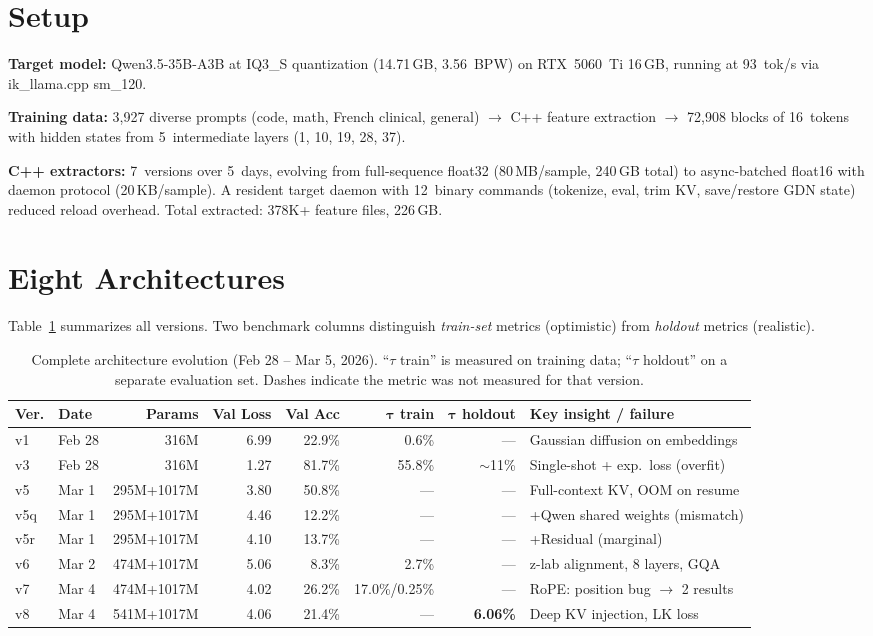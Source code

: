 \documentclass[10pt,a4paper]{article}
\begin{document}
\section{Setup}

\textbf{Target model:} Qwen3.5-35B-A3B at IQ3\_S quantization (14.71\,GB, 3.56~BPW) on RTX~5060~Ti 16\,GB, running at 93~tok/s via ik\_llama.cpp sm\_120.

\textbf{Training data:} 3{,}927 diverse prompts (code, math, French clinical, general) $\to$ C++ feature extraction $\to$ 72{,}908 blocks of 16~tokens with hidden states from 5~intermediate layers (1, 10, 19, 28, 37).

\textbf{C++ extractors:} 7~versions over 5~days, evolving from full-sequence float32 (80\,MB/sample, 240\,GB total) to async-batched float16 with daemon protocol (20\,KB/sample). A resident target daemon with 12~binary commands (tokenize, eval, trim KV, save/restore GDN state) reduced reload overhead. Total extracted: 378K+ feature files, 226\,GB.

\section{Eight Architectures}
\label{sec:arch}

Table~\ref{tab:full} summarizes all versions. Two benchmark columns distinguish \emph{train-set} metrics (optimistic) from \emph{holdout} metrics (realistic).

\begin{table}[h]
\centering
\caption{Complete architecture evolution (Feb 28 -- Mar 5, 2026). ``$\tau$ train'' is measured on training data; ``$\tau$ holdout'' on a separate evaluation set. Dashes indicate the metric was not measured for that version.}
\small
\begin{tabular}{llrrrrrl}
\toprule
\textbf{Ver.} & \textbf{Date} & \textbf{Params} & \textbf{Val Loss} & \textbf{Val Acc} & $\boldsymbol{\tau}$ \textbf{train} & $\boldsymbol{\tau}$ \textbf{holdout} & \textbf{Key insight / failure} \\
\midrule
v1  & Feb 28 & 316M & 6.99 & 22.9\% & 0.6\% & --- & Gaussian diffusion on embeddings \\
v3  & Feb 28 & 316M & 1.27 & 81.7\% & 55.8\% & $\sim$11\% & Single-shot + exp.\ loss (overfit) \\
v5  & Mar 1  & 295M+1017M & 3.80 & 50.8\% & --- & --- & Full-context KV, OOM on resume \\
v5q & Mar 1  & 295M+1017M & 4.46 & 12.2\% & --- & --- & +Qwen shared weights (mismatch) \\
v5r & Mar 1  & 295M+1017M & 4.10 & 13.7\% & --- & --- & +Residual (marginal) \\
v6  & Mar 2  & 474M+1017M & 5.06 & 8.3\% & 2.7\% & --- & z-lab alignment, 8 layers, GQA \\
v7  & Mar 4  & 474M+1017M & 4.02 & 26.2\% & 17.0\%/0.25\% & --- & RoPE: position bug $\to$ 2 results \\
v8  & Mar 4  & 541M+1017M & 4.06 & 21.4\% & --- & \textbf{6.06\%} & Deep KV injection, LK loss \\
\bottomrule
\end{tabular}
\label{tab:full}
\end{table}
\end{document}
